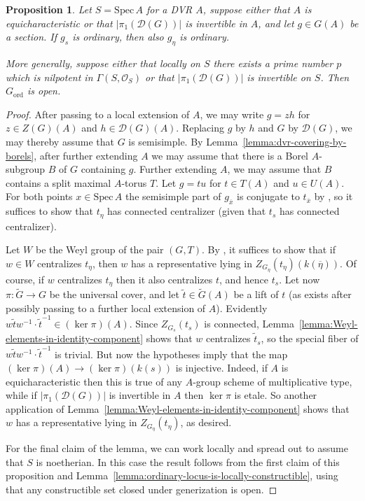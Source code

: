 \documentclass[11pt,reqno]{amsart}
\newtheorem{prop}[theorem]{Proposition}
\theoremstyle{definition}
\renewcommand{\rm}{\mathrm}
\newcommand{\Spec}{\mathrm{Spec} \,}
\newcommand{\sD}{{\mathscr D}}
\newcommand{\sO}{{\mathscr O}}
\begin{document}
\begin{prop}\label{prop:strong-purity-generizes}
Let $S = \Spec A$ for a DVR $A$, suppose either that $A$ is equicharacteristic or that $|\pi_1(\sD(G))|$ is invertible in $A$, and let $g \in G(A)$ be a section. If $g_s$ is ordinary, then also $g_\eta$ is ordinary. \smallskip

More generally, suppose either that locally on $S$ there exists a prime number $p$ which is nilpotent in $\Gamma(S, \sO_S)$ or that $|\pi_1(\sD(G))|$ is invertible on $S$. Then $G_{\rm{ord}}$ is open.
\end{prop}

\begin{proof}
After passing to a local extension of $A$, we may write $g = zh$ for $z \in Z(G)(A)$ and $h \in \sD(G)(A)$. Replacing $g$ by $h$ and $G$ by $\sD(G)$, we may thereby assume that $G$ is semisimple. By Lemma~\ref{lemma:dvr-covering-by-borels}, after further extending $A$ we may assume that there is a Borel $A$-subgroup $B$ of $G$ containing $g$. Further extending $A$, we may assume that $B$ contains a split maximal $A$-torus $T$. Let $g = tu$ for $t \in T(A)$ and $u \in U(A)$. For both points $x \in \Spec A$ the semisimple part of $g_{\overline{x}}$ is conjugate to $t_{\overline{x}}$ by \cite[Lem.\ 2.12]{SteinbergReg}, so it suffices to show that $t_\eta$ has connected centralizer (given that $t_s$ has connected centralizer). \smallskip

Let $W$ be the Weyl group of the pair $(G, T)$. By \cite[Lem.\ 2.14]{SteinbergTorsion}, it suffices to show that if $w \in W$ centralizes $t_\eta$, then $w$ has a representative lying in $Z_{G_\eta}(t_\eta)(k(\overline{\eta}))$. Of course, if $w$ centralizes $t_\eta$ then it also centralizes $t$, and hence $t_s$. Let now $\pi: \widetilde{G} \to G$ be the universal cover, and let $\widetilde{t} \in \widetilde{G}(A)$ be a lift of $t$ (as exists after possibly passing to a further local extension of $A$). Evidently $w\widetilde{t}w^{-1} \cdot \widetilde{t}^{-1} \in (\ker \pi)(A)$. Since $Z_{G_s}(t_s)$ is connected, Lemma~\ref{lemma:Weyl-elements-in-identity-component} shows that $w$ centralizes $\widetilde{t}_s$, so the special fiber of $w\widetilde{t}w^{-1} \cdot \widetilde{t}^{-1}$ is trivial. But now the hypotheses imply that the map $(\ker \pi)(A) \to (\ker \pi)(k(s))$ is injective. Indeed, if $A$ is equicharacteristic then this is true of any $A$-group scheme of multiplicative type, while if $|\pi_1(\sD(G))|$ is invertible in $A$ then $\ker \pi$ is etale. So another application of Lemma~\ref{lemma:Weyl-elements-in-identity-component} shows that $w$ has a representative lying in $Z_{G_\eta}(t_\eta)$, as desired. \smallskip

For the final claim of the lemma, we can work locally and spread out to assume that $S$ is noetherian. In this case the result follows from the first claim of this proposition and Lemma~\ref{lemma:ordinary-locus-is-locally-constructible}, using that any constructible set closed under generization is open.
\end{proof}
\end{document}
